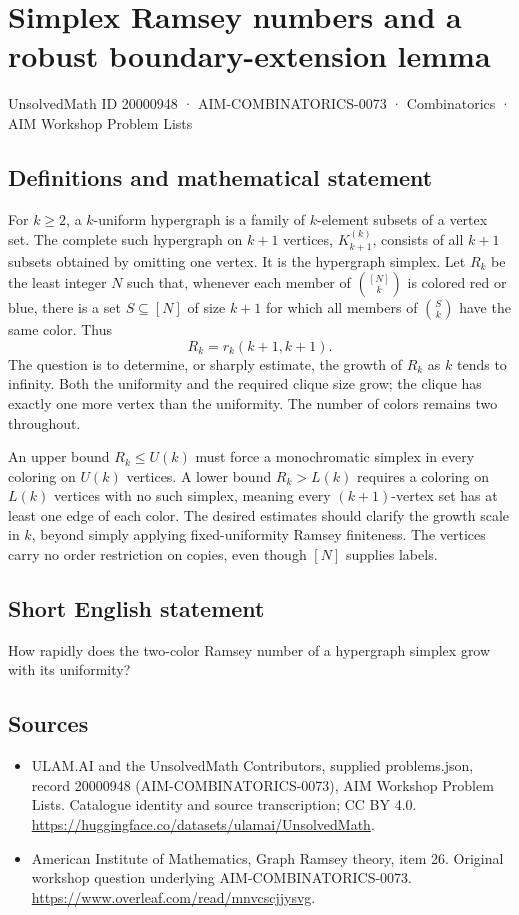 \documentclass[11pt,a4paper]{article}
\begin{document}
\section*{Simplex Ramsey numbers and a robust boundary-extension lemma}\label{20000948}
{\small UnsolvedMath ID 20000948 · AIM-COMBINATORICS-0073 · Combinatorics · AIM Workshop Problem Lists}
\subsection{Definitions and mathematical statement}
For $k\ge2$, a $k$-uniform hypergraph is a family of $k$-element
subsets of a vertex set. The complete such hypergraph on $k+1$
vertices, $K_{k+1}^{(k)}$, consists of all $k+1$ subsets obtained by
omitting one vertex. It is the hypergraph simplex.
Let $R_k$ be the least integer $N$ such that, whenever each member of
$\binom{[N]}k$ is colored red or blue, there is a set
$S\subseteq[N]$ of size $k+1$ for which all members of
$\binom Sk$ have the same color. Thus
\[
                        R_k=r_k(k+1,k+1).
\]
The question is to determine, or sharply estimate, the growth of $R_k$
as $k$ tends to infinity. Both the uniformity and the required clique
size grow; the clique has exactly one more vertex than the uniformity.
The number of colors remains two throughout.

An upper bound $R_k\le U(k)$ must force a monochromatic simplex in
every coloring on $U(k)$ vertices. A lower bound $R_k>L(k)$ requires
a coloring on $L(k)$ vertices with no such simplex, meaning every
$(k+1)$-vertex set has at least one edge of each color.
The desired estimates should clarify the growth scale in $k$, beyond
simply applying fixed-uniformity Ramsey finiteness. The vertices carry
no order restriction on copies, even though $[N]$ supplies labels.
\subsection{Short English statement}
How rapidly does the two-color Ramsey number of a hypergraph simplex grow with its uniformity?
\subsection{Sources}
\begin{itemize}
\item[S1] ULAM.AI and the UnsolvedMath Contributors, supplied problems.json, record 20000948 (AIM-COMBINATORICS-0073), AIM Workshop Problem Lists. Catalogue identity and source transcription; CC BY 4.0.
\url{https://huggingface.co/datasets/ulamai/UnsolvedMath}.
\item[S2] American Institute of Mathematics, Graph Ramsey theory, item 26. Original workshop question underlying AIM-COMBINATORICS-0073.
\url{https://www.overleaf.com/read/mnvcscjjysvg}.
\end{itemize}
\end{document}
